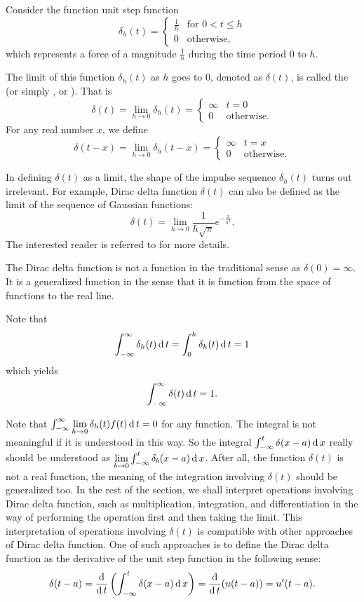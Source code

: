 Consider the function unit step function
\[
\delta_h(t)=\begin{cases}
  \frac{1}{h} & \text{for } 0< t\le h\\
  0 & \text{otherwise},
\end{cases}  
\]
which represents a force of a magnitude $\frac{1}{h}$ during the time period $0$ to $h$.

The limit of this function $\delta_h(t)$ as $h$ goes to $0$, denoted as $\delta(t)$, is called the  (or simply , or ). That is
\[\delta(t)=\lim\limits_{h\to 0}\delta_h(t)=\begin{cases}
  \infty & t=0\\
  0 & \text{otherwise}.
\end{cases}\]
For any real number $x$, we define
\[\delta(t-x)=\lim\limits_{h\to 0}\delta_h(t-x)=\begin{cases}
  \infty & t=x\\
  0 & \text{otherwise}.
\end{cases}
\]

\begin{remark}
  In defining $\delta(t)$ as a limit, the shape of the impulse sequence $\delta_h(t)$ turns out irrelevant. For example, Dirac delta function $\delta(t)$ can also be defined as the limit of the sequence of Gaussian functions:
  \[\delta(t)=\lim\limits_{h\to 0}\frac{1}{h\sqrt{\pi}}e^{-\frac{x}{h^2}}.\]
  The interested reader is referred to \autocite[Chapter 5]{Bracewell1999} for more details.
\end{remark}

The Dirac delta function is not a function in the traditional sense as $\delta(0)=\infty$. It is a generalized function in the sense that it is function from the space of functions to the real line.

Note that 
\[\int_{-\infty}^\infty \delta_h(t)\operatorname{d} t=\int_0^h\delta_h(t)\operatorname{d} t=1\]
which yields
\[\int_{-\infty}^\infty\delta(t)\operatorname{d} t=1.\]

Note that $\int_{-\infty}^\infty\lim\limits_{h\to 0}\delta_h(t)f(t)\operatorname{d} t=0$ for any function. The integral is not meaningful if it is understood in this way. So the integral $\int_{-\infty}^t\delta(x-a)\operatorname{d} x$ really should be understood as $\lim\limits_{b\to 0}\int_{-\infty}^t\delta_b(x-a)\operatorname{d} x$. After all, the function $\delta(t)$ is not a real function, the meaning of the integration involving $\delta(t)$ should be generalized too. In the rest of the section, we shall interpret operations involving Dirac delta function, such as multiplication, integration, and differentiation in the way of performing the operation first and then taking the limit. This interpretation of operations involving $\delta(t)$ is compatible with other approaches of Dirac delta function. One of such approaches is to define the Dirac delta function as the derivative of the unit step function in the following sense:
\[\delta(t-a)=\dfrac{\operatorname{d} }{\operatorname{d} t}\left(\int_{-\infty}^t\delta(x-a)\operatorname{d} x\right)=\dfrac{\operatorname{d} }{\operatorname{d} t}(u(t-a))=u'(t-a).\]

